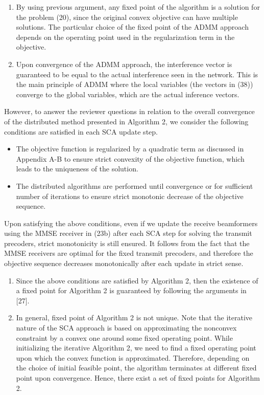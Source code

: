 \begin{enumerate}
\begin{enumerate}
\item By using previous argument, any fixed point of the algorithm is a solution for the problem (20), since the original convex objective can have multiple solutions. The particular choice of the fixed point of the \ac{ADMM} approach depends on the operating point used in the regularization term in the objective.

\item Upon convergence of the \ac{ADMM} approach, the interference vector is guaranteed to be equal to the actual interference seen in the network. This is the main principle of \ac{ADMM} where the local variables (the vectors in (38)) converge to the global variables, which are the actual inference vectors.

\end{enumerate}

However, to answer the reviewer questions in relation to the overall convergence of the distributed method presented in Algorithm 2, we consider the following conditions are satisfied in each \ac{SCA} update step.
\begin{itemize}
	\item The objective function is regularized by a quadratic term as discussed in Appendix A-B to ensure strict convexity of the objective function, which leads to the uniqueness of the solution.
	\item The distributed algorithms are performed until convergence or for sufficient number of iterations to ensure strict monotonic decrease of the objective sequence.
\end{itemize}
Upon satisfying the above conditions, even if we update the receive beamformers using the \ac{MMSE} receiver in (23b) after each \ac{SCA} step for solving the transmit precoders, strict monotonicity is still ensured. It follows from the fact that the \ac{MMSE} receivers are optimal for the fixed transmit precoders, and therefore the objective sequence decreases monotonically after each update in strict sense.

\begin{enumerate}
	\item Since the above conditions are satisfied by Algorithm 2, then the existence of a fixed point for Algorithm 2 is guaranteed by following the arguments in [27].
	
	\item In general, fixed point of Algorithm 2 is not unique. Note that the iterative nature of the \ac{SCA} approach is based on approximating the nonconvex constraint by a convex one around some fixed operating point. While initializing the iterative Algorithm 2, we need to find a fixed operating point upon which the convex function is approximated. Therefore, depending on the choice of initial feasible point, the algorithm terminates at different fixed point upon convergence. Hence, there exist a set of fixed points for Algorithm 2.
	

\end{enumerate}
\end{enumerate}
